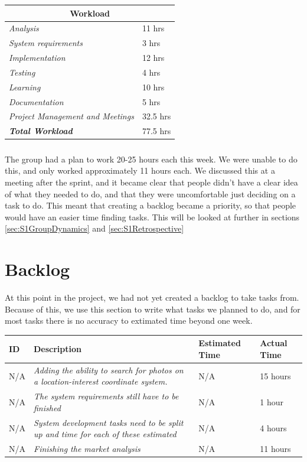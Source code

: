 \begin{minipage}{\linewidth}
\setlength{\tabcolsep}{25pt}
\centering
{}
\begin{tabular}{ |l|l| }
	\hline
	\multicolumn{2}{|c|}{\cellcolor{gray!25} Workload} \\
	\hline
	\it{Analysis} & 11 hrs\\
	\it{System requirements} & 3 hrs\\
	\it{Implementation} & 12 hrs\\
	\it{Testing} & 4 hrs\\
	\it{Learning} & 10 hrs\\
	\it{Documentation} & 5 hrs\\
	\it{Project Management and Meetings} & 32.5 hrs\\
	\hline
	\textbf{\textit{Total Workload}} & 77.5 hrs\\
	\hline
\end{tabular}
\end{minipage}

\subparagraph{} The group had a plan to work 20-25 hours each this week. We were unable to do this, and only worked approximately 11 hours each. We discussed this at a meeting after the sprint, and it became clear that people didn't have a clear idea of what they needed to do, and that they were uncomfortable just deciding on a task to do. This meant that creating a backlog became a priority, so that people would have an easier time finding tasks. This will be looked at further in sections \ref{sec:S1GroupDynamics} and \ref{sec:S1Retrospective}

\section{Backlog}
\label{sec:S1Backlog}
At this point in the project, we had not yet created a backlog to take tasks from. Because of this, we use this section to write what tasks we planned to do, and for most tasks there is no accuracy to extimated time beyond one week. \\
\begin{minipage}{\linewidth}
\setlength{\tabcolsep}{12pt}
\centering
{}
\begin{tabular}{|p{1cm}|p{4cm}|p{2cm}|p{2cm}|}
\hline
\cellcolor{gray!25} ID & \cellcolor{gray!25} Description & \cellcolor{gray!25} Estimated Time & \cellcolor{gray!25} Actual Time \\
\hline
N/A & \it{Adding the ability to search for photos on a location-interest coordinate system.} & N/A & 15 hours \\
N/A & \it{The system requirements still have to be finished} & N/A & 1 hour \\
N/A & \it{System development tasks need to be split up and time for each of these estimated} & N/A & 4 hours \\
N/A & \it{Finishing the market analysis} & N/A & 11 hours \\
\hline
\end{tabular}
\end{minipage}

